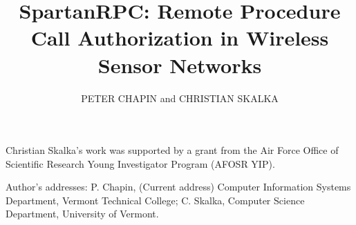 \documentclass[prodmode,acmtissec]{acmsmall}
\title{SpartanRPC: Remote Procedure Call Authorization in Wireless Sensor Networks}
\author{PETER CHAPIN and CHRISTIAN SKALKA \affil{University of Vermont}}
\begin{document}
\begin{bottomstuff}
  Christian Skalka’s work was supported by a grant from the Air Force
  Office of Scientific Research Young Investigator Program (AFOSR YIP).

  Author's addresses: P. Chapin, (Current address) Computer Information
  Systems Department, Vermont Technical College; C. Skalka, Computer
  Science Department, University of Vermont.
\end{bottomstuff}

\maketitle













\renewcommand{\showDOI}[1]{\unskip}


\end{document}
